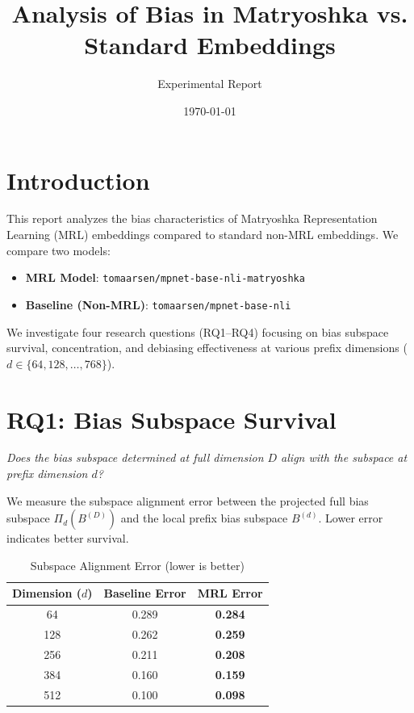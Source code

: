 \documentclass{article}
\title{Analysis of Bias in Matryoshka vs. Standard Embeddings}
\author{Experimental Report}
\date{\today}
\begin{document}
\maketitle

\section{Introduction}
This report analyzes the bias characteristics of Matryoshka Representation Learning (MRL) embeddings compared to standard non-MRL embeddings. We compare two models:
\begin{itemize}
    \item \textbf{MRL Model}: \texttt{tomaarsen/mpnet-base-nli-matryoshka}
    \item \textbf{Baseline (Non-MRL)}: \texttt{tomaarsen/mpnet-base-nli}
\end{itemize}

We investigate four research questions (RQ1--RQ4) focusing on bias subspace survival, concentration, and debiasing effectiveness at various prefix dimensions ($d \in \{64, 128, \dots, 768\}$).

\section{RQ1: Bias Subspace Survival}
\textit{Does the bias subspace determined at full dimension $D$ align with the subspace at prefix dimension $d$?}

We measure the subspace alignment error between the projected full bias subspace $\Pi_d(B^{(D)})$ and the local prefix bias subspace $B^{(d)}$. Lower error indicates better survival.

\begin{table}[H]
    \centering
    \caption{Subspace Alignment Error (lower is better)}
    \begin{tabular}{c c c}
    \toprule
    Dimension ($d$) & Baseline Error & MRL Error \\
    \midrule
    64 & 0.289 & \textbf{0.284} \\
    128 & 0.262 & \textbf{0.259} \\
    256 & 0.211 & \textbf{0.208} \\
    384 & 0.160 & \textbf{0.159} \\
    512 & 0.100 & \textbf{0.098} \\
    \bottomrule
    \end{tabular}
\end{table}
\end{document}

